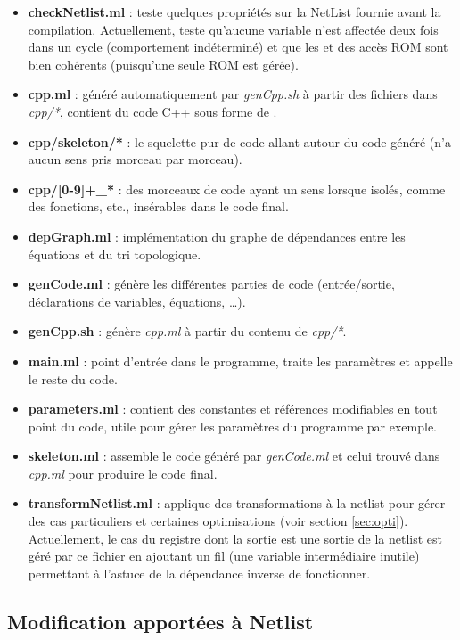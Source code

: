 \documentclass[11pt,a4paper]{article}
\begin{document}
\begin{itemize}
\item \textbf{checkNetlist.ml} : teste quelques propriétés sur la NetList fournie avant la compilation. Actuellement, teste qu'aucune variable n'est affectée deux fois dans un cycle (comportement indéterminé) et que les  et  des accès ROM sont bien cohérents (puisqu'une seule ROM est gérée).
\item \textbf{cpp.ml} : généré automatiquement par \textit{genCpp.sh} à partir des fichiers dans \textit{cpp/*}, contient du code C++ sous forme de .
\item \textbf{cpp/skeleton/*} : le squelette pur de code allant autour du code généré (n'a aucun sens pris morceau par morceau).
\item \textbf{cpp/[0-9]+\_*} : des morceaux de code ayant un sens lorsque isolés, comme des fonctions, etc., insérables dans le code final.
\item \textbf{depGraph.ml} : implémentation du graphe de dépendances entre les équations et du tri topologique.
\item \textbf{genCode.ml} : génère les différentes parties de code (entrée/sortie, déclarations de variables, équations, \ldots).
\item \textbf{genCpp.sh} : génère \textit{cpp.ml} à partir du contenu de \textit{cpp/*}.
\item \textbf{main.ml} : point d'entrée dans le programme, traite les paramètres et appelle le reste du code.
\item \textbf{parameters.ml} : contient des constantes et références modifiables en tout point du code, utile pour gérer les paramètres du programme par exemple.
\item \textbf{skeleton.ml} : assemble le code généré par \textit{genCode.ml} et celui trouvé dans \textit{cpp.ml} pour produire le code final.
\item \textbf{transformNetlist.ml} : applique des transformations à la netlist pour gérer des cas particuliers et certaines optimisations (voir section \ref{sec:opti}). Actuellement, le cas du registre dont la sortie est une sortie de la netlist est géré par ce fichier en ajoutant un \og fil \fg{} (une variable intermédiaire inutile) permettant à l'astuce de la dépendance inverse de fonctionner.
\end{itemize}

\subsection{Modification apportées à Netlist}
\end{document}
